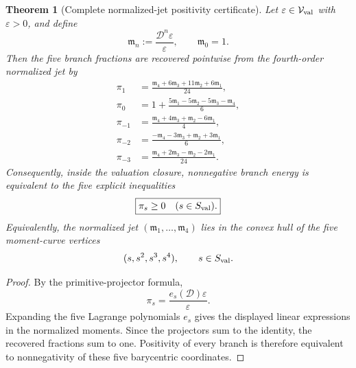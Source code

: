 \documentclass[aps,prd,preprint,onecolumn,nofootinbib,superscriptaddress,showkeys]{revtex4-2}
\numberwithin{equation}{section}
\theoremstyle{definition}
\theoremstyle{plain}
\newtheorem{theorem}{Theorem}[section]
\newcommand{\Dil}{\mathscr D}
\begin{document}
\begin{theorem}[Complete normalized-jet positivity certificate]\label{thm:jet-simplex}
Let $\varepsilon\in\mathcal V_{\rm val}$ with $\varepsilon>0$, and define
\begin{equation}
\mathfrak m_n:=\frac{\Dil^n\varepsilon}{\varepsilon},
\qquad \mathfrak m_0=1.
\end{equation}
Then the five branch fractions are recovered pointwise from the fourth-order normalized jet by
\begin{align}
\pi_{1}
&=\frac{\mathfrak m_4+6\mathfrak m_3+11\mathfrak m_2+6\mathfrak m_1}{24},\\
\pi_{0}
&=1+\frac{5\mathfrak m_1-5\mathfrak m_2-5\mathfrak m_3-\mathfrak m_4}{6},\\
\pi_{-1}
&=\frac{\mathfrak m_4+4\mathfrak m_3+\mathfrak m_2-6\mathfrak m_1}{4},\\
\pi_{-2}
&=\frac{-\mathfrak m_4-3\mathfrak m_3+\mathfrak m_2+3\mathfrak m_1}{6},\\
\pi_{-3}
&=\frac{\mathfrak m_4+2\mathfrak m_3-\mathfrak m_2-2\mathfrak m_1}{24}.
\end{align}
Consequently, inside the valuation closure, nonnegative branch energy is equivalent to the five explicit inequalities
\begin{equation}
\boxed{\pi_s\ge0\quad(s\in S_{\rm val}).}
\end{equation}
Equivalently, the normalized jet $(\mathfrak m_1,\ldots,\mathfrak m_4)$ lies in the convex hull of the five moment-curve vertices
\begin{equation}
(s,s^2,s^3,s^4),
\qquad s\in S_{\rm val}.
\end{equation}
\end{theorem}

\begin{proof}
By the primitive-projector formula,
\[
\pi_s=\frac{e_s(\Dil)\varepsilon}{\varepsilon}.
\]
Expanding the five Lagrange polynomials $e_s$ gives the displayed linear expressions in the normalized moments.  Since the projectors sum to the identity, the recovered fractions sum to one.  Positivity of every branch is therefore equivalent to nonnegativity of these five barycentric coordinates.
\end{proof}
\end{document}
